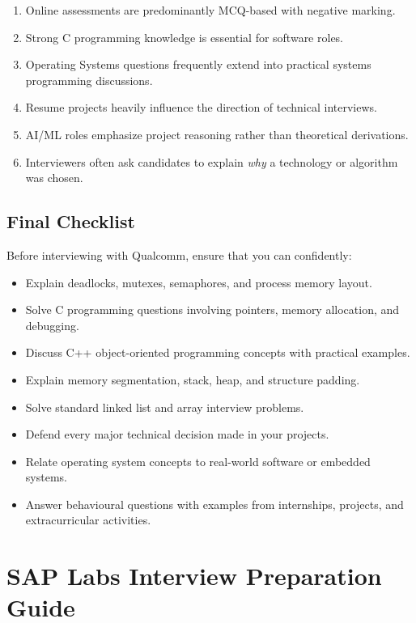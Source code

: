 \documentclass[11pt,a4paper]{article}
\begin{document}
\begin{enumerate}
	\item Online assessments are predominantly MCQ-based with negative marking.
	\item Strong C programming knowledge is essential for software roles.
	\item Operating Systems questions frequently extend into practical systems programming discussions.
	\item Resume projects heavily influence the direction of technical interviews.
	\item AI/ML roles emphasize project reasoning rather than theoretical derivations.
	\item Interviewers often ask candidates to explain \emph{why} a technology or algorithm was chosen.
\end{enumerate}


\subsection{Final Checklist}

Before interviewing with Qualcomm, ensure that you can confidently:

\begin{itemize}
	\item Explain deadlocks, mutexes, semaphores, and process memory layout.
	\item Solve C programming questions involving pointers, memory allocation, and debugging.
	\item Discuss C++ object-oriented programming concepts with practical examples.
	\item Explain memory segmentation, stack, heap, and structure padding.
	\item Solve standard linked list and array interview problems.
	\item Defend every major technical decision made in your projects.
	\item Relate operating system concepts to real-world software or embedded systems.
	\item Answer behavioural questions with examples from internships, projects, and extracurricular activities.
\end{itemize}

\section{SAP Labs Interview Preparation Guide}
\end{document}
